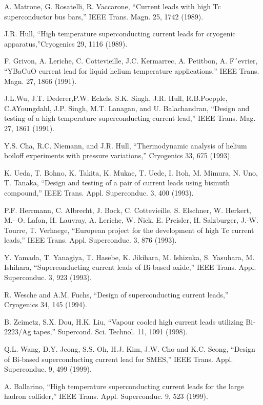 \noindent [4.59] A. Matrone, G. Rosatelli, R. Vaccarone, ``Current leads with high Tc superconductor bus bars,” IEEE Trans. Magn. 25, 1742 (1989).

\noindent [4.60] J.R. Hull, ``High temperature superconducting current leads for cryogenic apparatus,”Cryogenics 29, 1116 (1989).

\noindent [4.61] F. Grivon, A. Leriche, C. Cottevieille, J.C. Kermarrec, A. Petitbon, A. F´evrier,
``YBaCuO current lead for liquid helium temperature applications,” IEEE Trans.
Magn. 27, 1866 (1991).

\noindent [4.62] J.L.Wu, J.T. Dederer,P.W. Eckels, S.K. Singh, J.R. Hull, R.B.Poepple, C.AYoungdahl,
J.P. Singh, M.T. Lanagan, and U. Balachandran, ``Design and testing of a high
temperature superconducting current lead,” IEEE Trans. Mag. 27, 1861 (1991).

\noindent [4.63] Y.S. Cha, R.C. Niemann, and J.R. Hull, ``Thermodynamic analysis of helium boiloff
experiments with pressure variations,” Cryogenics 33, 675 (1993).

\noindent [4.64] K. Ueda, T. Bohno, K. Takita, K. Mukae, T. Uede, I. Itoh, M. Mimura, N. Uno,
T. Tanaka, ``Design and testing of a pair of current leads using bismuth compound,”
IEEE Trans. Appl. Superconduc. 3, 400 (1993).

\noindent [4.65] P.F. Herrmann, C. Albrecht, J. Bock, C. Cottevieille, S. Elschner, W. Herkert, M.-
O. Lafon, H. Lauvray, A. Leriche, W. Nick, E. Preisler, H. Salzburger, J.-W. Tourre,
T. Verhaege, ``European project for the development of high Tc current leads,”
IEEE Trans. Appl. Superconduc. 3, 876 (1993).

\noindent [4.66] Y. Yamada, T. Yanagiya, T. Hasebe, K. Jikihara, M. Ishizuka, S. Yasuhara, M. Ishihara, ``Superconducting current leads of Bi-based oxide,” IEEE Trans. Appl. Superconduc. 3, 923 (1993).

\noindent [4.67] R. Wesche and A.M. Fuchs, ``Design of superconducting current leads,” Cryogenics 34, 145 (1994).

\noindent [4.68] B. Zeimetz, S.X. Dou, H.K. Liu, ``Vapour cooled high current leads utilizing Bi-
2223/Ag tapes,” Supercond. Sci. Technol. 11, 1091 (1998).

\noindent [4.69] Q.L. Wang, D.Y. Jeong, S.S. Oh, H.J. Kim, J.W. Cho and K.C. Seong, ``Design of Bi-based superconducting current lead for SMES,” IEEE Trans. Appl. Superconduc.
9, 499 (1999).

\noindent [4.70] A. Ballarino, ``High temperature superconducting current leads for the large hadron collider,” IEEE Trans. Appl. Superconduc. 9, 523 (1999).

